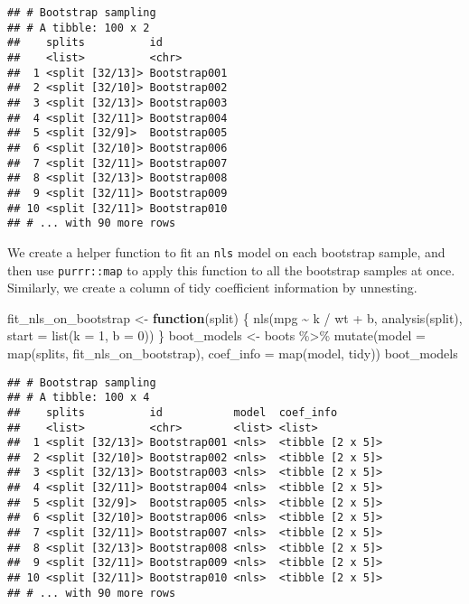 \documentclass[
]{book}
\newenvironment{Shaded}{\begin{snugshade}}{\end{snugshade}}
\newcommand{\AttributeTok}[1]{\textcolor[rgb]{0.77,0.63,0.00}{#1}}
\newcommand{\ControlFlowTok}[1]{\textcolor[rgb]{0.13,0.29,0.53}{\textbf{#1}}}
\newcommand{\DecValTok}[1]{\textcolor[rgb]{0.00,0.00,0.81}{#1}}
\newcommand{\FunctionTok}[1]{\textcolor[rgb]{0.00,0.00,0.00}{#1}}
\newcommand{\NormalTok}[1]{#1}
\newcommand{\OtherTok}[1]{\textcolor[rgb]{0.56,0.35,0.01}{#1}}
\newcommand{\SpecialCharTok}[1]{\textcolor[rgb]{0.00,0.00,0.00}{#1}}
\begin{document}
\begin{verbatim}
## # Bootstrap sampling 
## # A tibble: 100 x 2
##    splits          id          
##    <list>          <chr>       
##  1 <split [32/13]> Bootstrap001
##  2 <split [32/10]> Bootstrap002
##  3 <split [32/13]> Bootstrap003
##  4 <split [32/11]> Bootstrap004
##  5 <split [32/9]>  Bootstrap005
##  6 <split [32/10]> Bootstrap006
##  7 <split [32/11]> Bootstrap007
##  8 <split [32/13]> Bootstrap008
##  9 <split [32/11]> Bootstrap009
## 10 <split [32/11]> Bootstrap010
## # ... with 90 more rows
\end{verbatim}

We create a helper function to fit an \texttt{nls} model on each bootstrap sample, and then use \texttt{purrr::map} to apply this function to all the bootstrap samples at once. Similarly, we create a column of tidy coefficient information by unnesting.

\begin{Shaded}
\begin{Highlighting}[]
\NormalTok{fit\_nls\_on\_bootstrap }\OtherTok{\textless{}{-}} \ControlFlowTok{function}\NormalTok{(split) \{}
    \FunctionTok{nls}\NormalTok{(mpg }\SpecialCharTok{\textasciitilde{}}\NormalTok{ k }\SpecialCharTok{/}\NormalTok{ wt }\SpecialCharTok{+}\NormalTok{ b, }\FunctionTok{analysis}\NormalTok{(split), }\AttributeTok{start =} \FunctionTok{list}\NormalTok{(}\AttributeTok{k =} \DecValTok{1}\NormalTok{, }\AttributeTok{b =} \DecValTok{0}\NormalTok{))}
\NormalTok{\}}
\NormalTok{boot\_models }\OtherTok{\textless{}{-}}\NormalTok{ boots }\SpecialCharTok{\%\textgreater{}\%} 
    \FunctionTok{mutate}\NormalTok{(}\AttributeTok{model =} \FunctionTok{map}\NormalTok{(splits, fit\_nls\_on\_bootstrap),}
           \AttributeTok{coef\_info =} \FunctionTok{map}\NormalTok{(model, tidy))}
\NormalTok{boot\_models}
\end{Highlighting}
\end{Shaded}

\begin{verbatim}
## # Bootstrap sampling 
## # A tibble: 100 x 4
##    splits          id           model  coef_info       
##    <list>          <chr>        <list> <list>          
##  1 <split [32/13]> Bootstrap001 <nls>  <tibble [2 x 5]>
##  2 <split [32/10]> Bootstrap002 <nls>  <tibble [2 x 5]>
##  3 <split [32/13]> Bootstrap003 <nls>  <tibble [2 x 5]>
##  4 <split [32/11]> Bootstrap004 <nls>  <tibble [2 x 5]>
##  5 <split [32/9]>  Bootstrap005 <nls>  <tibble [2 x 5]>
##  6 <split [32/10]> Bootstrap006 <nls>  <tibble [2 x 5]>
##  7 <split [32/11]> Bootstrap007 <nls>  <tibble [2 x 5]>
##  8 <split [32/13]> Bootstrap008 <nls>  <tibble [2 x 5]>
##  9 <split [32/11]> Bootstrap009 <nls>  <tibble [2 x 5]>
## 10 <split [32/11]> Bootstrap010 <nls>  <tibble [2 x 5]>
## # ... with 90 more rows
\end{verbatim}
\end{document}
